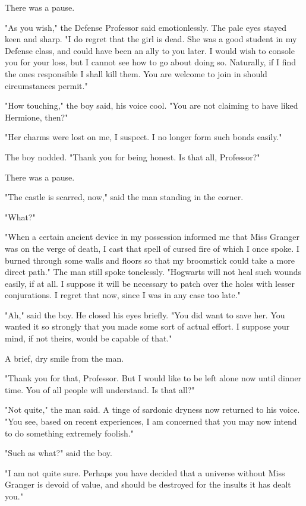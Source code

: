 There was a pause.

"As you wish," the Defense Professor said emotionlessly. The pale eyes stayed
keen and sharp. "I do regret that the girl is dead. She was a good student in
my Defense class, and could have been an ally to you later. I would wish to
console you for your loss, but I cannot see how to go about doing so.
Naturally, if I find the ones responsible I shall kill them. You are welcome to
join in should circumstances permit."

"How touching," the boy said, his voice cool. "You are not claiming to have
liked Hermione, then?"

"Her charms were lost on me, I suspect. I no longer form such bonds easily."

The boy nodded. "Thank you for being honest. Is that all, Professor?"

There was a pause.

"The castle is scarred, now," said the man standing in the corner.

"What?"

"When a certain ancient device in my possession informed me that Miss Granger
was on the verge of death, I cast that spell of cursed fire of which I once
spoke. I burned through some walls and floors so that my broomstick could take
a more direct path." The man still spoke tonelessly. "Hogwarts will not heal
such wounds easily, if at all. I suppose it will be necessary to patch over the
holes with lesser conjurations. I regret that now, since I was in any case too
late."

"Ah," said the boy. He closed his eyes briefly. "You did want to save her. You
wanted it so strongly that you made some sort of actual effort. I suppose your
mind, if not theirs, would be capable of that."

A brief, dry smile from the man.

"Thank you for that, Professor. But I would like to be left alone now until
dinner time. You of all people will understand. Is that all?"

"Not quite," the man said. A tinge of sardonic dryness now returned to his
voice. "You see, based on recent experiences, I am concerned that you may now
intend to do something extremely foolish."

"Such as what?" said the boy.

"I am not quite sure. Perhaps you have decided that a universe without Miss
Granger is devoid of value, and should be destroyed for the insults it has
dealt you."

